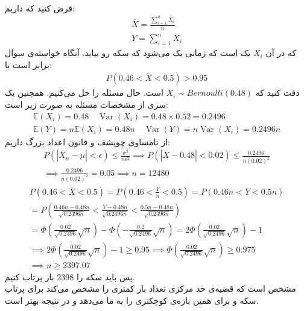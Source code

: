 \\
فرض کنید که داریم:
\begin{gather*}
    \bar{X} = \frac{\sum_{i=1}^n X_i}{n}\\
    Y = \sum_{i=1}^n X_i
\end{gather*}
که در آن
$X_i$
یک
است که زمانی یک می‌شود که سکه رو بیاید. آنگاه خواسته‌ی سوال برابر است با:
\begin{gather*}
    P(0.46 < \bar{X} < 0.5) > 0.95
\end{gather*}
دقت کنید که
$X_i \sim Bernoulli(0.48)$
است. حال مسئله را حل می‌کنیم.
همچنین یک سری از مشخصات مسئله به صورت زیر است:
\begin{gather*}
    \mathbb{E}(X_i) = 0.48 \quad \operatorname{Var}(X_i) = 0.48 \times 0.52 = 0.2496\\
    \mathbb{E}(Y) = n \mathbb{E}(X_i) = 0.48n \quad \operatorname{Var}(Y) = n\operatorname{Var}(X_i) = 0.2496n
\end{gather*}
از نامساوی چویشف و قانون اعداد بزرگ داریم:
\begin{gather*}
    P(|\bar{X}_n - \mu| < \epsilon) \leq \frac{\sigma^2}{n\epsilon^2} \implies P(|\bar{X} - 0.48| < 0.02) \leq \frac{0.2496}{n(0.02)^2}\\
    \implies \frac{0.2496}{n(0.02)^2} = 0.05 \implies n = 12480
\end{gather*}
\begin{gather*}
    P(0.46 < \bar{X} < 0.5) = P(0.46 < \frac{Y}{n} < 0.5) = P(0.46n < Y < 0.5n)\\
    = P(\frac{0.46n - 0.48n}{\sqrt{0.2496n}} < \frac{Y - 0.48n}{\sqrt{0.2496n}} < \frac{0.5n - 0.48n}{\sqrt{0.2496n}})\\
    = \Phi(\frac{0.02}{\sqrt{0.2496}}\sqrt{n}) - \Phi(-\frac{0.2}{\sqrt{0.2496}}\sqrt{n}) = 2\Phi(\frac{0.02}{\sqrt{0.2496}}\sqrt{n}) - 1\\
    \implies 2\Phi(\frac{0.02}{\sqrt{0.2496}}\sqrt{n}) - 1 \ge 0.95 \implies \Phi(\frac{0.02}{\sqrt{0.2496}}\sqrt{n}) \ge 0.975\\
    \implies n \ge 2397.07
\end{gather*}
پس باید سکه را
2398
بار پرتاب کنیم.
\\
مشخص است که قضیه‌ی حد مرکزی تعداد بار کمتری را مشخص می‌کند برای پرتاب سکه و برای همین بازه‌ی کوچکتری را به ما
می‌دهد و در نتیجه بهتر است.





